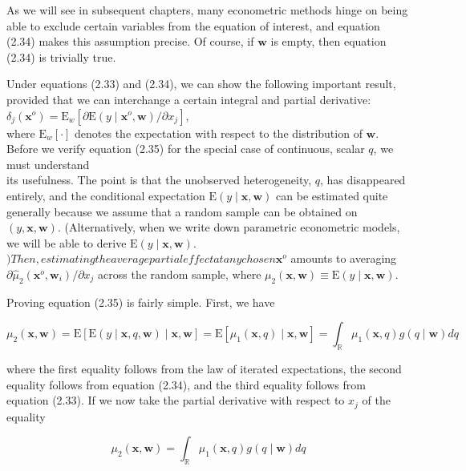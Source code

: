 \documentclass[10pt]{article}
\begin{document}
As we will see in subsequent chapters, many econometric methods hinge on being able to exclude certain variables from the equation of interest, and equation (2.34) makes this assumption precise. Of course, if $\mathbf{w}$ is empty, then equation (2.34) is trivially true.

Under equations (2.33) and (2.34), we can show the following important result, provided that we can interchange a certain integral and partial derivative:\\
$\delta_{j}\left(\mathbf{x}^{o}\right)=\mathrm{E}_{w}\left[\partial \mathrm{E}\left(y \mid \mathbf{x}^{o}, \mathbf{w}\right) / \partial x_{j}\right]$,\\
where $\mathrm{E}_{w}[\cdot]$ denotes the expectation with respect to the distribution of $\mathbf{w}$. Before we verify equation (2.35) for the special case of continuous, scalar $q$, we must understand\\
its usefulness. The point is that the unobserved heterogeneity, $q$, has disappeared entirely, and the conditional expectation $\mathrm{E}(y \mid \mathbf{x}, \mathbf{w})$ can be estimated quite generally because we assume that a random sample can be obtained on $(y, \mathbf{x}, \mathbf{w})$. (Alternatively, when we write down parametric econometric models, we will be able to derive $\mathrm{E}(y \mid \mathbf{x}, \mathbf{w})$.$) Then, estimating the average partial effect at any chosen \mathbf{x}^{o}$ amounts to averaging $\partial \hat{\mu}_{2}\left(\mathbf{x}^{o}, \mathbf{w}_{i}\right) / \partial x_{j}$ across the random sample, where $\mu_{2}(\mathbf{x}, \mathbf{w}) \equiv \mathrm{E}(y \mid \mathbf{x}, \mathbf{w})$.

Proving equation (2.35) is fairly simple. First, we have

$$
\mu_{2}(\mathbf{x}, \mathbf{w})=\mathrm{E}[\mathrm{E}(y \mid \mathbf{x}, q, \mathbf{w}) \mid \mathbf{x}, \mathbf{w}]=\mathrm{E}\left[\mu_{1}(\mathbf{x}, q) \mid \mathbf{x}, \mathbf{w}\right]=\int_{\mathbb{R}} \mu_{1}(\mathbf{x}, q) g(q \mid \mathbf{w}) d q
$$

where the first equality follows from the law of iterated expectations, the second equality follows from equation (2.34), and the third equality follows from equation (2.33). If we now take the partial derivative with respect to $x_{j}$ of the equality


\begin{equation*}
\mu_{2}(\mathbf{x}, \mathbf{w})=\int_{\mathbb{R}} \mu_{1}(\mathbf{x}, q) g(q \mid \mathbf{w}) d q \tag{2.36}
\end{equation*}
\end{document}
